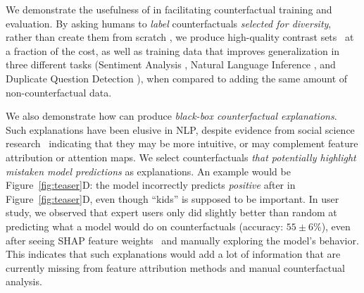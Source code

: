 We demonstrate the usefulness of \sysname in facilitating counterfactual training and evaluation. 
By asking humans to \emph{label} counterfactuals \emph{selected for diversity}, rather than create them from scratch \cite{gardner2020contrast, kaushik2019learning}, we produce high-quality contrast sets~\cite{gardner2020contrast} at a fraction of the cost, as well as training data that improves generalization in three different tasks (Sentiment Analysis \sst, Natural Language Inference \nli, and Duplicate Question Detection \qqp), when compared to adding the same amount of non-counterfactual data.



We also demonstrate how \sysname can produce \emph{black-box counterfactual explanations}.
Such explanations have been elusive in NLP, despite evidence from social science research~\cite{miller} indicating that they may be more intuitive, or may complement feature attribution or attention maps. 
We select \sysname counterfactuals \emph{that potentially highlight mistaken model predictions} as explanations.
An example would be Figure~\ref{fig:teaser}D: the model incorrectly predicts \emph{positive} after  in Figure~\ref{fig:teaser}D, even though ``kids'' is supposed to be important.
In user study, we observed that expert users only did slightly better than random at predicting what a model would do on \sysname counterfactuals (accuracy: $55 \pm 6\%$), even after seeing SHAP feature weights~\cite{NIPS2017_7062} and manually exploring the model's behavior. 
This indicates that such explanations would add a lot of information that are currently missing from feature attribution methods and manual counterfactual analysis.

